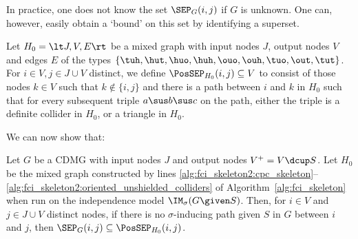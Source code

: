 In practice, one does not know the set $\SEP_G(i,j)$ if $G$ is unknown.
One can, however, easily obtain a `bound' on this set by identifying a superset.
\begin{Def}\label{def:possep}
  Let $H_0 = \lt J,V,E\rt$ be a mixed graph with input nodes $J$, output nodes $V$ and edges $E$ of the types $\{\tuh,\hut,\huo,\huh,\ouo,\ouh,\tuo,\out,\tut\}$.
  For $i \in V, j \in J \cup V$ distinct, we define $\PosSEP_{H_0}(i,j) \subseteq V$ to consist of those nodes
  $k \in V$ such that $k \not\in \{i,j\}$ and there is a path between $i$ and $k$ in $H_0$ such that for
  every subsequent triple $a \sus b \sus c$ on the path, either the triple is a definite collider in $H_0$,
  or a triangle in $H_0$.
\end{Def}
We can now show that:
\begin{Lem}\label{lem:possep}
  Let $G$ be a CDMG with input nodes $J$ and output nodes $V^+ = V \dcup S$.
  Let $H_0$ be the mixed graph constructed by lines 
  \ref{alg:fci_skeleton2:cpc_skeleton}--\ref{alg:fci_skeleton2:oriented_unshielded_colliders}
  of Algorithm~\ref{alg:fci_skeleton} when run on the independence model $\IM_\sigma(G \given S)$.
  Then, for $i \in V$ and $j \in J \cup V$ distinct nodes, if there is no $\sigma$-inducing path given $S$ in $G$ between $i$ and $j$, then
  $\SEP_G(i,j) \subseteq \PosSEP_{H_0}(i,j)$.
\end{Lem}
